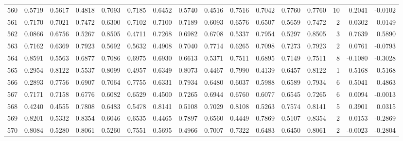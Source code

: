 \begin{tabular}{lrrrrrrrrrrrrrrr}
560 &      0.5719 &  0.5617 &  0.4818 &  0.7093 &  0.7185 &  0.6452 &  0.5740 &  0.4516 &  0.7516 &  0.7042 &   0.7760 &     0.7760 &     10 &                    0.2041 &                    -0.0102 \\
561 &      0.7170 &  0.7021 &  0.7472 &  0.6300 &  0.7102 &  0.7100 &  0.7189 &  0.6093 &  0.6576 &  0.6507 &   0.5659 &     0.7472 &      2 &                    0.0302 &                    -0.0149 \\
562 &      0.0866 &  0.6756 &  0.5267 &  0.8505 &  0.4711 &  0.7268 &  0.6982 &  0.6708 &  0.5337 &  0.7954 &   0.5297 &     0.8505 &      3 &                    0.7639 &                     0.5890 \\
563 &      0.7162 &  0.6369 &  0.7923 &  0.5692 &  0.5632 &  0.4908 &  0.7040 &  0.7714 &  0.6265 &  0.7098 &   0.7273 &     0.7923 &      2 &                    0.0761 &                    -0.0793 \\
564 &      0.8591 &  0.5563 &  0.6877 &  0.7086 &  0.6975 &  0.6930 &  0.6613 &  0.5371 &  0.7511 &  0.6895 &   0.7149 &     0.7511 &      8 &                   -0.1080 &                    -0.3028 \\
565 &      0.2954 &  0.8122 &  0.5537 &  0.8099 &  0.4957 &  0.6349 &  0.8073 &  0.4467 &  0.7990 &  0.4139 &   0.6457 &     0.8122 &      1 &                    0.5168 &                     0.5168 \\
566 &      0.2893 &  0.7756 &  0.6907 &  0.7064 &  0.7755 &  0.6331 &  0.7934 &  0.6480 &  0.6037 &  0.5988 &   0.6589 &     0.7934 &      6 &                    0.5041 &                     0.4863 \\
567 &      0.7171 &  0.7158 &  0.6776 &  0.6082 &  0.6529 &  0.4500 &  0.7265 &  0.6944 &  0.6760 &  0.6077 &   0.6545 &     0.7265 &      6 &                    0.0094 &                    -0.0013 \\
568 &      0.4240 &  0.4555 &  0.7808 &  0.6483 &  0.5478 &  0.8141 &  0.5108 &  0.7029 &  0.8108 &  0.5263 &   0.7574 &     0.8141 &      5 &                    0.3901 &                     0.0315 \\
569 &      0.8201 &  0.5332 &  0.8354 &  0.6046 &  0.6535 &  0.4465 &  0.7897 &  0.6560 &  0.4449 &  0.7869 &   0.5107 &     0.8354 &      2 &                    0.0153 &                    -0.2869 \\
570 &      0.8084 &  0.5280 &  0.8061 &  0.5260 &  0.7551 &  0.5695 &  0.4966 &  0.7007 &  0.7322 &  0.6483 &   0.6450 &     0.8061 &      2 &                   -0.0023 &                    -0.2804 \\

\end{tabular}
